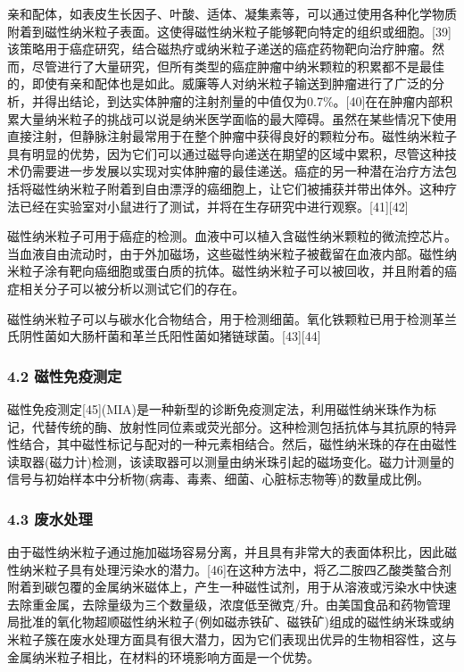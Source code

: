 亲和配体，如表皮生长因子、叶酸、适体、凝集素等，可以通过使用各种化学物质附着到磁性纳米粒子表面。这使得磁性纳米粒子能够靶向特定的组织或细胞。[39]该策略用于癌症研究，结合磁热疗或纳米粒子递送的癌症药物靶向治疗肿瘤。然而，尽管进行了大量研究，但所有类型的癌症肿瘤中纳米颗粒的积累都不是最佳的，即使有亲和配体也是如此。威廉等人对纳米粒子输送到肿瘤进行了广泛的分析，并得出结论，到达实体肿瘤的注射剂量的中值仅为0.7\%。[40]在在肿瘤内部积累大量纳米粒子的挑战可以说是纳米医学面临的最大障碍。虽然在某些情况下使用直接注射，但静脉注射最常用于在整个肿瘤中获得良好的颗粒分布。磁性纳米粒子具有明显的优势，因为它们可以通过磁导向递送在期望的区域中累积，尽管这种技术仍需要进一步发展以实现对实体肿瘤的最佳递送。癌症的另一种潜在治疗方法包括将磁性纳米粒子附着到自由漂浮的癌细胞上，让它们被捕获并带出体外。这种疗法已经在实验室对小鼠进行了测试，并将在生存研究中进行观察。[41][42]

磁性纳米粒子可用于癌症的检测。血液中可以植入含磁性纳米颗粒的微流控芯片。当血液自由流动时，由于外加磁场，这些磁性纳米粒子被截留在血液内部。磁性纳米粒子涂有靶向癌细胞或蛋白质的抗体。磁性纳米粒子可以被回收，并且附着的癌症相关分子可以被分析以测试它们的存在。

磁性纳米粒子可以与碳水化合物结合，用于检测细菌。氧化铁颗粒已用于检测革兰氏阴性菌如大肠杆菌和革兰氏阳性菌如猪链球菌。[43][44]

\subsubsection{4.2 磁性免疫测定}
磁性免疫测定[45](MIA)是一种新型的诊断免疫测定法，利用磁性纳米珠作为标记，代替传统的酶、放射性同位素或荧光部分。这种检测包括抗体与其抗原的特异性结合，其中磁性标记与配对的一种元素相结合。然后，磁性纳米珠的存在由磁性读取器(磁力计)检测，该读取器可以测量由纳米珠引起的磁场变化。磁力计测量的信号与初始样本中分析物(病毒、毒素、细菌、心脏标志物等)的数量成比例。

\subsubsection{4.3 废水处理}
由于磁性纳米粒子通过施加磁场容易分离，并且具有非常大的表面体积比，因此磁性纳米粒子具有处理污染水的潜力。[46]在这种方法中，将乙二胺四乙酸类螯合剂附着到碳包覆的金属纳米磁体上，产生一种磁性试剂，用于从溶液或污染水中快速去除重金属，去除量级为三个数量级，浓度低至微克/升。由美国食品和药物管理局批准的氧化物超顺磁性纳米粒子(例如磁赤铁矿、磁铁矿)组成的磁性纳米珠或纳米粒子簇在废水处理方面具有很大潜力，因为它们表现出优异的生物相容性，这与金属纳米粒子相比，在材料的环境影响方面是一个优势。

